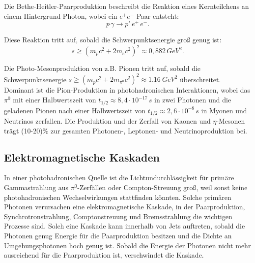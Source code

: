 Die Bethe-Heitler-Paarproduktion beschreibt die Reaktion eines Kernteilchens an einem Hintergrund-Photon, wobei ein $e^+e^-$-Paar entsteht:
\begin{equation}
 p \, \gamma \rightarrow p' \, e^+ \, e^-.
\end{equation}

Diese Reaktion tritt auf, sobald die Schwerpunktsenergie groß genug ist:
\begin{equation}
 s \geq (m_p c^2 +2 m_e c^2)^2 \approx 0,882\, \si{GeV^2}.
\end{equation}

Die Photo-Mesonproduktion von z.B. Pionen tritt auf, sobald die Schwerpunktsenergie $s \geq (m_p c^2 +2 m_{\pi^0} c^2)^2 \approx \SI{1,16}{GeV^2}$ überschreitet.
Dominant ist die Pion-Produktion in photohadronischen Interaktionen, wobei das $\pi^0$ mit einer Halbwertszeit von $t_{1/2}\approx 8,4\cdot 10^{-17}\,\si{s}$ in zwei Photonen und die geladenen Pionen nach einer Halbwertszeit von $t_{1/2}\approx 2,6\cdot 10^{-8}\,\si{s}$ in Myonen und Neutrinos zerfallen.
Die Produktion und der Zerfall von Kaonen und $\eta$-Mesonen trägt (10-20)\% zur gesamten Photonen-, Leptonen- und Neutrinoproduktion bei.\cite{RelativisticJets}


\subsection{Elektromagnetische Kaskaden}
In einer photohadronischen Quelle ist die Lichtundurchlässigkeit für primäre Gammastrahlung aus $\pi^0$-Zerfällen oder Compton-Streuung groß, weil sonst keine photohadronischen Wechselwirkungen stattfinden könnten.
Solche primären Photonen verursachen eine elektromagnetische Kaskade, in der Paarproduktion, Synchrotronstrahlung, Comptonstreuung und Bremsstrahlung die wichtigen Prozesse sind.
Solch eine Kaskade kann innerhalb von Jets auftreten, sobald die Photonen genug Energie für die Paarproduktion besitzen und die Dichte an Umgebungsphotonen hoch genug ist.
Sobald die Energie der Photonen nicht mehr ausreichend für die Paarproduktion ist, verschwindet die Kaskade.\cite{RelativisticJets}


